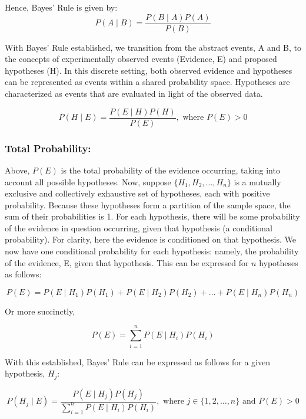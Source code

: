 \documentclass[12pt]{article}
\begin{document}
\noindent Hence, Bayes' Rule is given by:
\begin{equation}
P(A \mid B) = \frac{P(B \mid A) P(A)}{P(B)}
\end{equation}

\noindent With Bayes' Rule established, we transition from the abstract events, A and B, to the concepts of experimentally observed events (Evidence, E) and proposed hypotheses (H). In this discrete setting, both observed evidence and hypotheses can be represented as events within a shared probability space. Hypotheses are characterized as events that are evaluated in light of the observed data.

\begin{equation}
P(H \mid E) = \frac{P(E \mid H) P(H)}{P(E)}, \text{ where } P(E) > 0
\end{equation}

\subsubsection*{Total Probability:}
\noindent Above, $P(E)$ is the total probability of the evidence occurring, taking into account all possible hypotheses. Now, suppose $\{H_1, H_2, \ldots, H_n\}$ is a mutually exclusive and collectively exhaustive set of hypotheses, each with positive probability. Because these hypotheses form a partition of the sample space, the sum of their probabilities is 1. For each hypothesis, there will be some probability of the evidence in question occurring, given that hypothesis (a conditional probability). For clarity, here the evidence is conditioned on that hypothesis. We now have one conditional probability for each hypothesis: namely, the probability of the evidence, E, given that hypothesis. This can be expressed for $n$ hypotheses as follows:

\begin{equation}
P(E) = P(E \mid H_1) P(H_1) + P(E \mid H_2) P(H_2) + ... + P(E \mid H_n) P(H_n)
\end{equation}

\noindent Or more succinctly, 

\begin{equation}
P(E) = \sum_{i=1}^{n} P(E \mid H_i) P(H_i)
\end{equation}

\noindent With this established, Bayes' Rule can be expressed as follows for a given hypothesis, $H_j$: 

\begin{equation}
P(H_j \mid E) = \frac{P(E \mid H_j) P(H_j)}{\sum_{i=1}^{n} P(E \mid H_i) P(H_i)}, \text{ where } j \in \{1, 2, \ldots, n\} \text{ and } P(E) > 0
\end{equation}
\end{document}
